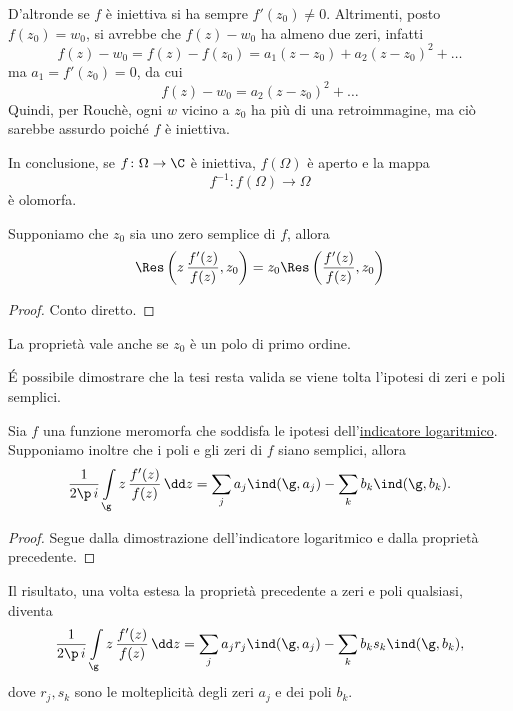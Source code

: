 D'altronde se \(f\) è iniettiva si ha sempre \(f'(z_0)\neq 0\).
Altrimenti, posto \(f(z_0)=w_0\), si avrebbe che \(f(z)-w_0\) ha almeno due zeri, infatti
\[
	f(z)-w_0 = f(z)-f(z_0) = a_1(z-z_0)+a_2(z-z_0)^2+\ldots
\]
ma \(a_1 = f'(z_0)=0\), da cui
\[
	f(z)-w_0 = a_2(z-z_0)^2 + \ldots
\]
Quindi, per Rouchè, ogni \(w\) vicino a \(z_0\) ha più di una retroimmagine, ma ciò sarebbe assurdo poiché \(f\) è iniettiva.

In conclusione, se \(f\colon \Omega \to \C\) è iniettiva, \(f(\Omega)\) è aperto e la mappa
\[
	f^{-1}\colon f(\Omega) \longrightarrow \Omega
\]
è olomorfa.

\begin{pr}
	Supponiamo che \(z_0\) sia uno zero semplice di \(f\), allora
	\[
		\Res \left( z\,\frac{f'(z)}{f(z)},z_0 \right) = z_0\Res \left( \frac{f'(z)}{f(z)},z_0 \right)
	\]
\end{pr}

\begin{proof}
	Conto diretto.
\end{proof}

\begin{oss}
	La proprietà vale anche se \(z_0\) è un polo di primo ordine.
\end{oss}

\begin{oss}
	\'E possibile dimostrare che la tesi resta valida se viene tolta l'ipotesi di zeri e poli semplici.
\end{oss}

\begin{pr}
	Sia \(f\) una funzione meromorfa che soddisfa le ipotesi dell'\hyperref[th:teoremaIndicatoreLogaritmico]{indicatore logaritmico}.
	Supponiamo inoltre che i poli e gli zeri di \(f\) siano semplici, allora
	\[
		\frac{1}{2\p\,i} \int\limits_\g z\,\frac{f'(z)}{f(z)}\,\dd z = \sum_j a_j \ind(\g,a_j) - \sum_k b_k \ind(\g,b_k).
	\]
\end{pr}

\begin{proof}
	Segue dalla dimostrazione dell'indicatore logaritmico e dalla proprietà precedente.
\end{proof}

\begin{oss}
	Il risultato, una volta estesa la proprietà precedente a zeri e poli qualsiasi, diventa
	\[
		\frac{1}{2\p\,i} \int\limits_\g z\,\frac{f'(z)}{f(z)}\,\dd z = \sum_j a_j r_j \ind(\g,a_j) - \sum_k b_k s_k \ind(\g,b_k),
	\]
	dove \(r_j,s_k\) sono le molteplicità degli zeri  \(a_j\) e dei poli \(b_k\).
\end{oss}

